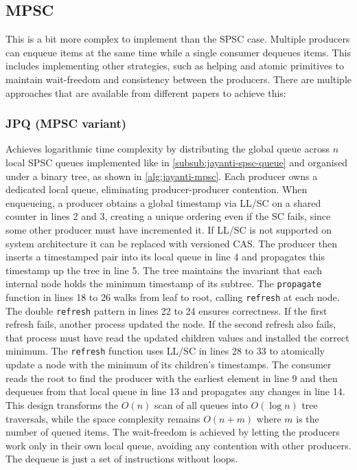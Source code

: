 \subsection{\acf{MPSC}}\label{subsec:multiple-producer-and-single-consumer}
This is a bit more complex to implement than the \ac{SPSC} case. Multiple producers can enqueue items at the same time while a single consumer dequeues items. This includes implementing other strategies, such as helping and atomic primitives to maintain wait-freedom and consistency between the producers. There are multiple approaches that are available from different papers to achieve this:

\subsubsection{\acf{JPQ} (\ac{MPSC} variant)}\label{subsub:jayanti-mpsc-queue}
Achieves logarithmic time complexity by distributing the global queue across $n$ local \ac{SPSC} queues implemented like in \cref{subsub:jayanti-spsc-queue} and organised under a binary tree, as shown in \cref{alg:jayanti-mpsc}. Each producer owns a dedicated local queue, eliminating producer-producer contention. When enqueueing, a producer obtains a global timestamp via \ac{LL/SC} on a shared counter in lines 2 and 3, creating a unique ordering even if the \ac{SC} fails, since some other producer must have incremented it. If \ac{LL/SC} is not supported on system architecture it can be replaced with versioned \ac{CAS}. The producer then inserts a timestamped pair into its local queue in line 4 and propagates this timestamp up the tree in line 5. The tree maintains the invariant that each internal node holds the minimum timestamp of its subtree. The \texttt{propagate} function in lines 18 to 26 walks from leaf to root, calling \texttt{refresh} at each node. The double \texttt{refresh} pattern in lines 22 to 24 ensures correctness. If the first refresh fails, another process updated the node. If the second refresh also fails, that process must have read the updated children values and installed the correct minimum. The \texttt{refresh} function uses \ac{LL/SC} in lines 28 to 33 to atomically update a node with the minimum of its children's timestamps. The consumer reads the root to find the producer with the earliest element in line 9 and then dequeues from that local queue in line 13 and propagates any changes in line 14. This design transforms the $O(n)$ scan of all queues into $O(\log n)$ tree traversals, while the space complexity remains $O(n + m)$ where $m$ is the number of queued items. The wait-freedom is achieved by letting the producers work only in their own local queue, avoiding any contention with other producers. The dequeue is just a set of instructions without loops. \cite{JayantiLog}

